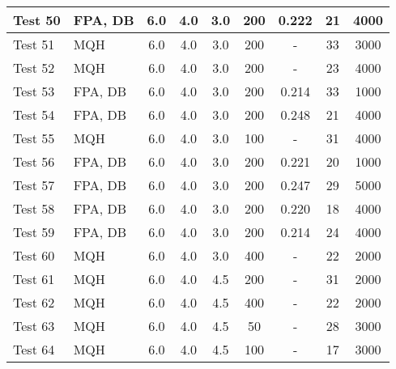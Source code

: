 \begin{table}[!ht]
\begin{center}
\begin{tabular}{|l|l|c|c|c|c|c|c|c|}
Test 50    &  FPA, DB           &  6.0       &  4.0       &  3.0       &  200            &  0.222          &  21                &  4000            \\ \hline
Test 51    &  MQH               &  6.0       &  4.0       &  3.0       &  200            &  -              &  33                &  3000            \\ \hline
Test 52    &  MQH               &  6.0       &  4.0       &  3.0       &  200            &  -              &  23                &  4000            \\ \hline
Test 53    &  FPA, DB           &  6.0       &  4.0       &  3.0       &  200            &  0.214          &  33                &  1000            \\ \hline
Test 54    &  FPA, DB           &  6.0       &  4.0       &  3.0       &  200            &  0.248          &  21                &  4000            \\ \hline
Test 55    &  MQH               &  6.0       &  4.0       &  3.0       &  100            &  -              &  31                &  4000            \\ \hline
Test 56    &  FPA, DB           &  6.0       &  4.0       &  3.0       &  200            &  0.221          &  20                &  1000            \\ \hline
Test 57    &  FPA, DB           &  6.0       &  4.0       &  3.0       &  200            &  0.247          &  29                &  5000            \\ \hline
Test 58    &  FPA, DB           &  6.0       &  4.0       &  3.0       &  200            &  0.220          &  18                &  4000            \\ \hline
Test 59    &  FPA, DB           &  6.0       &  4.0       &  3.0       &  200            &  0.214          &  24                &  4000            \\ \hline
Test 60    &  MQH               &  6.0       &  4.0       &  3.0       &  400            &  -              &  22                &  2000            \\ \hline
Test 61    &  MQH               &  6.0       &  4.0       &  4.5       &  200            &  -              &  31                &  2000            \\ \hline
Test 62    &  MQH               &  6.0       &  4.0       &  4.5       &  400            &  -              &  22                &  2000            \\ \hline
Test 63    &  MQH               &  6.0       &  4.0       &  4.5       &  50             &  -              &  28                &  3000            \\ \hline
Test 64    &  MQH               &  6.0       &  4.0       &  4.5       &  100            &  -              &  17                &  3000            \\ \hline
\end{tabular}
\end{center}
\end{table}



